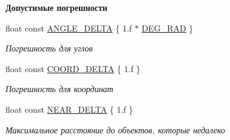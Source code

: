 \begin{Indent}\textbf{ Допустимые погрешности}\par
\begin{DoxyCompactItemize}
\item 
\mbox{\label{namespacertm_ac78c5105838adb58682cb69a4c66efd7}} 
float const \hyperlink{namespacertm_ac78c5105838adb58682cb69a4c66efd7}{A\+N\+G\+L\+E\+\_\+\+D\+E\+L\+TA} \{ 1.f $\ast$ \hyperlink{namespacertm_a797faf3037681ed7bc153db9eca6155e}{D\+E\+G\+\_\+\+R\+AD} \}
\begin{DoxyCompactList}\small\item\em Погрешность для углов \end{DoxyCompactList}\item 
\mbox{\label{namespacertm_a9ae158a8873bdf59aa9872cdada6c657}} 
float const \hyperlink{namespacertm_a9ae158a8873bdf59aa9872cdada6c657}{C\+O\+O\+R\+D\+\_\+\+D\+E\+L\+TA} \{ 1.f \}
\begin{DoxyCompactList}\small\item\em Погрешность для координат \end{DoxyCompactList}\item 
float const \hyperlink{namespacertm_ac6b72ea86e31b2b9ba35f29964ce0f5d}{N\+E\+A\+R\+\_\+\+D\+E\+L\+TA} \{ 1.f \}
\begin{DoxyCompactList}\small\item\em Максимальное расстояние до объектов, которые недалеко \end{DoxyCompactList}\end{DoxyCompactItemize}
\end{Indent}
